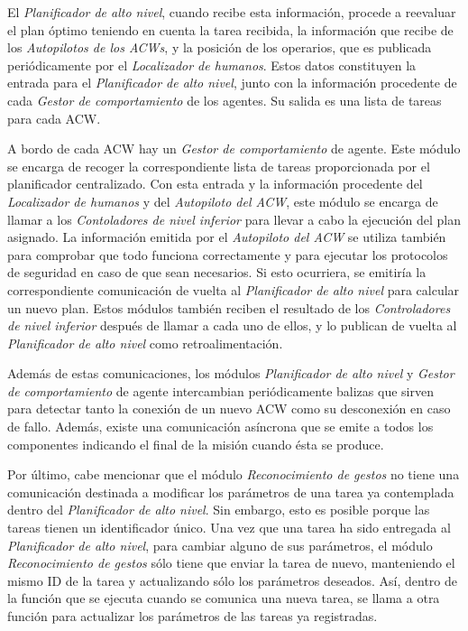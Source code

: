 \documentclass[fontsize=11pt, English=false, Español=true, Myfinal=true, twoside, numbers=noenddot]{scrbook}
\begin{document}
El \emph{Planificador de alto nivel}, cuando recibe esta información, procede a reevaluar el plan óptimo teniendo en cuenta la tarea recibida, la información que recibe de los \emph{Autopilotos de los \glspl{ACW}}, y la posición de los operarios, que es publicada periódicamente por el \emph{Localizador de humanos}. Estos datos constituyen la entrada para el \emph{Planificador de alto nivel}, junto con la información procedente de cada \emph{Gestor de comportamiento} de los agentes. Su salida es una lista de tareas para cada \gls{ACW}.

A bordo de cada \gls{ACW} hay un \emph{Gestor de comportamiento} de agente. Este módulo se encarga de recoger la correspondiente lista de tareas proporcionada por el planificador centralizado. Con esta entrada y la información procedente del \emph{Localizador de humanos} y del \emph{Autopiloto del \gls{ACW}}, este módulo se encarga de llamar a los \emph{Contoladores de nivel inferior} para llevar a cabo la ejecución del plan asignado. La información emitida por el \emph{Autopiloto del \gls{ACW}} se utiliza también para comprobar que todo funciona correctamente y para ejecutar los protocolos de seguridad en caso de que sean necesarios. Si esto ocurriera, se emitiría la correspondiente comunicación de vuelta al \emph{Planificador de alto nivel} para calcular un nuevo plan. Estos módulos también reciben el resultado de los \emph{Controladores de nivel inferior} después de llamar a cada uno de ellos, y lo publican de vuelta al \emph{Planificador de alto nivel} como retroalimentación.

Además de estas comunicaciones, los módulos \emph{Planificador de alto nivel} y \emph{Gestor de comportamiento} de agente intercambian periódicamente balizas que sirven para detectar tanto la conexión de un nuevo \gls{ACW} como su desconexión en caso de fallo. Además, existe una comunicación asíncrona que se emite a todos los componentes indicando el final de la misión cuando ésta se produce.

Por último, cabe mencionar que el módulo \emph{Reconocimiento de gestos} no tiene una comunicación destinada a modificar los parámetros de una tarea ya contemplada dentro del \emph{Planificador de alto nivel}. Sin embargo, esto es posible porque las tareas tienen un identificador único. Una vez que una tarea ha sido entregada al \emph{Planificador de alto nivel}, para cambiar alguno de sus parámetros, el módulo \emph{Reconocimiento de gestos} sólo tiene que enviar la tarea de nuevo, manteniendo el mismo \gls{ID} de la tarea y actualizando sólo los parámetros deseados. Así, dentro de la función que se ejecuta cuando se comunica una nueva tarea, se llama a otra función para actualizar los parámetros de las tareas ya registradas.
\end{document}
